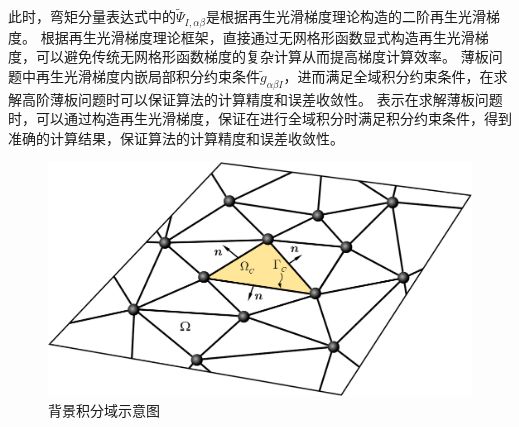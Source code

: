 此时，弯矩分量表达式中的$\tilde{\Psi}_{I,\alpha\beta}$是根据再生光滑梯度理论\cite{}构造的二阶再生光滑梯度。
根据再生光滑梯度理论框架，直接通过无网格形函数显式构造再生光滑梯度，可以避免传统无网格形函数梯度的复杂计算从而提高梯度计算效率。
薄板问题中再生光滑梯度内嵌局部积分约束条件$\tilde{g}_{\alpha\beta I}$，进而满足全域积分约束条件，在求解高阶薄板问题时可以保证算法的计算精度和误差收敛性。
表示在求解薄板问题时，可以通过构造再生光滑梯度，保证在进行全域积分时满足积分约束条件，得到准确的计算结果，保证算法的计算精度和误差收敛性。
\begin{figure}[H]
    \centering
    \includegraphics[scale=0.5]{figure/PHR/momentlisan.png}
    \caption{背景积分域示意图}\label{Pintegralscheme}
\end{figure}
